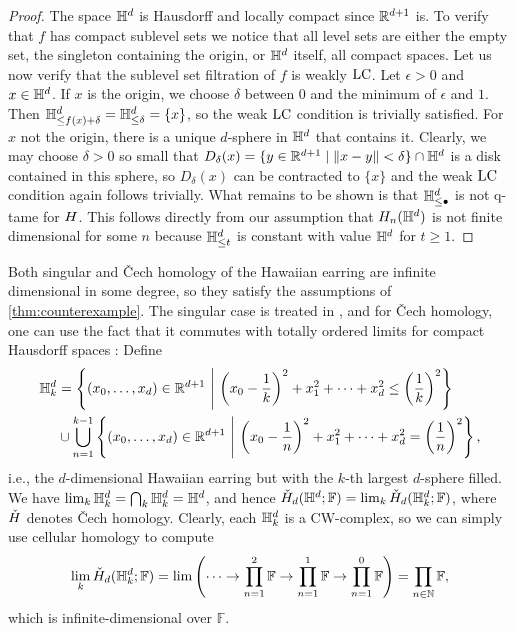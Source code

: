 \begin{proof}
	The space $\mathbb{H}^d$ is Hausdorff and locally compact since $\mathbb{R}^{d+1}$ is.
	To verify that $f$ has compact sublevel sets we notice that all level sets are either the empty set, the singleton containing the origin, or $\mathbb{H}^d$ itself, all compact spaces.
	Let us now verify that the sublevel set filtration of $f$ is weakly $\mathrm{LC}$.
	Let $\epsilon > 0$ and $x \in \mathbb{H}^d$.
	If $x$ is the origin, we choose $\delta$ between $0$ and the minimum of $\epsilon$ and $1$.
	Then $\mathbb{H}^d_{\leq f(x) + \delta} = \mathbb{H}^d_{\leq \delta} = \{x\}$, so the weak $\mathrm{LC}$ condition is trivially satisfied.
	For $x$ not the origin, there is a unique $d$-sphere in $\mathbb{H}^d$ that contains it.
	Clearly, we may choose $\delta > 0$ so small that $D_\delta(x) = \{y \in \mathbb{R}^{d+1} \mid \Vert x - y \Vert < \delta\} \cap \mathbb{H}^d$ is a disk contained in this sphere, so $D_\delta(x)$ can be contracted to $\{x\}$ and the weak $\mathrm{LC}$ condition again follows trivially.
	What remains to be shown is that $\mathbb{H}^d_{\leq \bullet}$ is not q-tame for $H$. This follows directly from our assumption that $H_{n}(\mathbb{H}^d)$ is not finite dimensional for some $n$ because $\mathbb{H}^d_{\leq t}$ is constant with value $\mathbb{H}^d$ for $t \geq 1$.
\end{proof}

Both singular and \v{C}ech homology of the Hawaiian earring are infinite dimensional in some degree, so they satisfy the assumptions of \cref{thm:counterexample}. The singular case is treated in \cite{Barratt.1962}, and for \v{C}ech homology, one can use the fact that it commutes with totally ordered limits for compact Hausdorff spaces \cite[Theorems VIII.3.6.\@ and X.3.1.]{MR0050886}:
	Define 
	\begin{align*}
	\HE_k &= \left\{ (x_0, \dots, x_d) \in \R^{d+1} \ \middle|\  \left( x_0 - \frac{1}{k} \right)^2 + x_1^2 + \dots + x_d^2 \leq \left( \frac{1}{k} \right)^2 \right\} \\
	& \cup \bigcup_{n=1}^{k-1} \left\{ (x_0, \dots, x_d) \in \R^{d+1} \ \middle|\  \left( x_0 - \frac{1}{n} \right)^2 + x_1^2 + \dots + x_d^2 = \left( \frac{1}{n} \right)^2 \right \},
	\end{align*}
	i.e., the $d$-dimensional Hawaiian earring but with the $k$-th largest $d$-sphere filled.
	We have $\lim_{k} \mathbb{H}^d_{k} = \bigcap_{k} \mathbb{H}^d_{k} = \mathbb{H}^d$, and hence $\check{H}_{d}(\mathbb{H}^d; \mathbb{F}) = \lim_{k} \check{H}_{d}(\mathbb{H}^d_{k}; \mathbb{F})$, where $\check{H}$ denotes \v{C}ech homology.
	Clearly, each $\mathbb{H}^d_{k}$ is a CW-complex, so we can simply use cellular homology to compute
	\begin{equation*}
	\lim_{k}\check{H}_{d}(\mathbb{H}^{d}_{k}; \mathbb{F})=\lim\left(\dots\to \prod_{n=1}^2\mathbb{F}\to \prod_{n=1}^1\mathbb{F}\to \prod_{n=1}^0\mathbb{F}\right)=\prod_{n\in\mathbb{N}}\mathbb{F},
	\end{equation*}
	which is infinite-dimensional over $\mathbb{F}$. 

